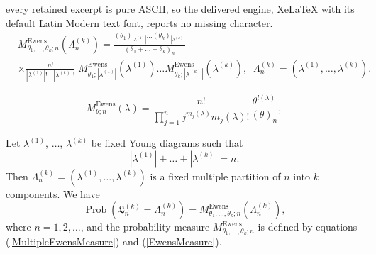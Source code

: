 \documentclass[10pt,a4paper]{amsart}
\DeclareMathOperator{\Ewens}{Ewens}
\DeclareMathOperator{\Prob}{Prob}
\begin{document}
every retained excerpt is pure ASCII, so the delivered engine, XeLaTeX with its default Latin Modern text font, reports no missing character.
\begin{equation}\label{MultipleEwensMeasure}
\begin{split}
&M_{\theta_1,\ldots,\theta_k;n}^{\Ewens}\left(\Lambda_n^{(k)}\right)
=\frac{\left(\theta_1\right)_{|\lambda^{(1)}|}\ldots \left(\theta_k\right)_{|\lambda^{(k)}|
}}{\left(\theta_1+\ldots+\theta_k\right)_n}\\
&\times\frac{n!}{|\lambda^{(1)}|!\ldots |\lambda^{(k)}|!}\;
M_{\theta_1;|\lambda^{(1)}|}^{\Ewens}\left(\lambda^{(1)}\right)
\ldots M_{\theta_k;|\lambda^{(k)}|}^{\Ewens}\left(\lambda^{(k)}\right),\;\;
\Lambda_n^{(k)}=\left(\lambda^{(1)},\ldots,\lambda^{(k)}\right).
\end{split}
\end{equation}

\begin{equation}\label{EwensMeasure}
M_{\theta; n}^{\Ewens}\left(\lambda\right)=\frac{n!}{\prod_{j=1}^{n}j^{m_j(\lambda)}m_j(\lambda)!}\frac{\theta^{l(\lambda)}}{(\theta)_n},
\end{equation}

\begin{thm}\label{TheoremGeneralizedHoope}
Let $\lambda^{(1)}$, $\ldots$, $\lambda^{(k)}$ be fixed
Young diagrams such that
$$
\left|\lambda^{(1)}\right|+\ldots+\left|\lambda^{(k)}\right|=n.
$$
Then $\Lambda_n^{(k)}=\left(\lambda^{(1)},\ldots,\lambda^{(k)}\right)$ is a fixed multiple partition of $n$ into $k$ components. We have
\begin{equation}
\Prob\left(\mathfrak{L}_n^{(k)}=\Lambda_n^{(k)}\right)=M_{\theta_1,\ldots,\theta_k;n}^{\Ewens}\left(\Lambda_n^{(k)}\right),
\end{equation}
where $n=1,2,\ldots$, and the probability measure $M_{\theta_1,\ldots,\theta_k;n}^{\Ewens}$ is defined by equations (\ref{MultipleEwensMeasure}) and (\ref{EwensMeasure}).
\end{thm}
\end{document}
